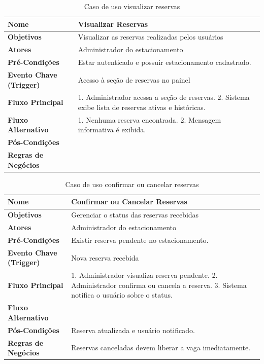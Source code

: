 \begin{table}[H]
\begin{center}
\caption{Caso de uso visualizar reservas}
\label{tab:caso-uso-visualizar-reservas}
\begin{tabular}{|p{4cm}|p{9cm}|}
\hline
\textbf{Nome} & Visualizar Reservas \\
\hline
\textbf{Objetivos} & Visualizar as reservas realizadas pelos usuários \\
\hline
\textbf{Atores} & Administrador do estacionamento \\
\hline
\textbf{Pré-Condições} & Estar autenticado e possuir estacionamento cadastrado. \\
\hline
\textbf{Evento Chave (Trigger)} & Acesso à seção de reservas no painel \\
\hline
\textbf{Fluxo Principal} & 1. Administrador acessa a seção de reservas. 2. Sistema exibe lista de reservas ativas e históricas. \\
\hline
\textbf{Fluxo Alternativo} & 1. Nenhuma reserva encontrada. 2. Mensagem informativa é exibida. \\
\hline
\textbf{Pós-Condições} & \\
\hline
\textbf{Regras de Negócios} & \\
\hline
\end{tabular}
\end{center}
\end{table}

\begin{table}[H]
\begin{center}
\caption{Caso de uso confirmar ou cancelar reservas}
\label{tab:caso-uso-confirmar-cancelar-reservas}
\begin{tabular}{|p{4cm}|p{9cm}|}
\hline
\textbf{Nome} & Confirmar ou Cancelar Reservas \\
\hline
\textbf{Objetivos} & Gerenciar o status das reservas recebidas \\
\hline
\textbf{Atores} & Administrador do estacionamento \\
\hline
\textbf{Pré-Condições} & Existir reserva pendente no estacionamento. \\
\hline
\textbf{Evento Chave (Trigger)} & Nova reserva recebida \\
\hline
\textbf{Fluxo Principal} & 1. Administrador visualiza reserva pendente. 2. Administrador confirma ou cancela a reserva. 3. Sistema notifica o usuário sobre o status. \\
\hline
\textbf{Fluxo Alternativo} & \\
\hline
\textbf{Pós-Condições} & Reserva atualizada e usuário notificado. \\
\hline
\textbf{Regras de Negócios} & Reservas canceladas devem liberar a vaga imediatamente. \\
\hline
\end{tabular}
\end{center}
\end{table}

